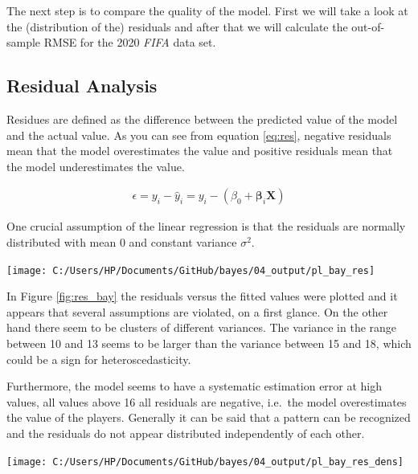 \documentclass[12pt,a4paper]{article}
\let\origfigure\figure
\let\endorigfigure\endfigure
\renewenvironment{figure}[1][2] {
    \expandafter\origfigure\expandafter[H]
} {
    \endorigfigure
}
\begin{document}
The next step is to compare the quality of the model. First we will take
a look at the (distribution of the) residuals and after that we will
calculate the out-of-sample \ac{RMSE} for the 2020 \emph{FIFA} data set.

\hypertarget{residual-analysis}{%
\subsection{Residual Analysis}\label{residual-analysis}}

Residues are defined as the difference between the predicted value of
the model and the actual value. As you can see from equation
\eqref{eq:res}, negative residuals mean that the model overestimates the
value and positive residuals mean that the model underestimates the
value. \autocite[p.~16]{hayashi_econometrics_2000}

\begin{align} 
\label{eq:res}
  \epsilon =  y_i - \hat{y}_i =  y_i - (  \beta_0  + \pmb{\beta}_i \pmb{X})
\end{align}

One crucial assumption of the linear regression is that the residuals
are normally distributed with mean \(0\) and constant variance
\(\sigma^2\).

\begin{figure}

\texttt{[image: C:/Users/HP/Documents/GitHub/bayes/04\_output/pl\_bay\_res]} \hfill{}

\caption{ \label{fig:res_bay} Plot of the Residuals vs Fitted Values for the Bayesian LASSO}\label{fig:fig2}
\end{figure}

In Figure \ref{fig:res_bay} the residuals versus the fitted values were
plotted and it appears that several assumptions are violated, on a first
glance. On the other hand there seem to be clusters of different
variances. The variance in the range between 10 and 13 seems to be
larger than the variance between 15 and 18, which could be a sign for
heteroscedasticity.

Furthermore, the model seems to have a systematic estimation error at
high values, all values above 16 all residuals are negative, i.e.~the
model overestimates the value of the players. Generally it can be said
that a pattern can be recognized and the residuals do not appear
distributed independently of each other.

\begin{figure}

\texttt{[image: C:/Users/HP/Documents/GitHub/bayes/04\_output/pl\_bay\_res\_dens]} \hfill{}

\caption{ \label{fig:den_res_bay} Distribution of the Residuals of the Bayesian LASSO}\label{fig:fig_dens_2}
\end{figure}
\end{document}
